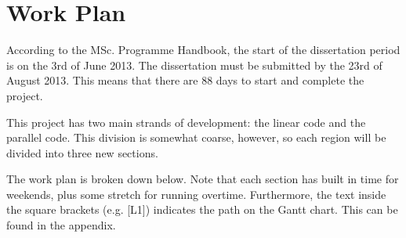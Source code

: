 \documentclass[main.tex]{subfiles}
\begin{document}
  \section{Work Plan}
    According to the MSc. Programme Handbook\cite{url:msc-handbook}, the start of the dissertation period is on the 3rd of June 2013.
    The dissertation must be submitted by the 23rd of August 2013.
    This means that there are 88 days to start and complete the project.

    This project has two main strands of development: the linear code and the parallel code.
    This division is somewhat coarse, however, so each region will be divided into three new sections.

    The work plan is broken down below.
    Note that each section has built in time for weekends, plus some stretch for running overtime.
    Furthermore, the text inside the square brackets (e.g. [L1]) indicates the path on the Gantt chart.
    This can be found in the appendix.
\end{document}
